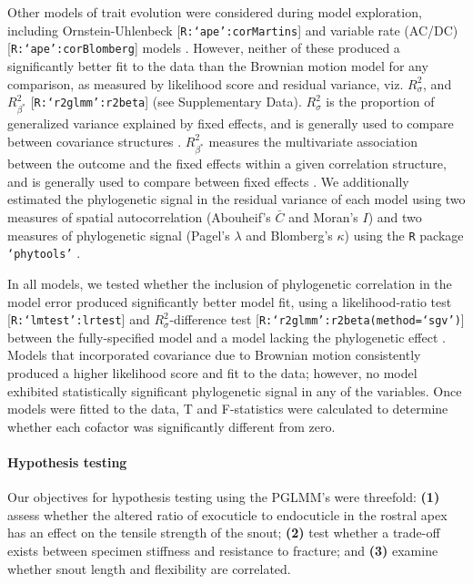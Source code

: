 \documentclass[twocolumn, linenumbers, superscriptaddress, nofootinbib]{revtex4-1}
\begin{document}
				Other models of trait evolution were considered during model exploration, including Ornstein-Uhlenbeck [\texttt{R:`ape':corMartins}] and variable rate (AC/DC) [\texttt{R:`ape':corBlomberg}] models \cite{Munkemuller2012, Ape}.
				However, neither of these produced a significantly better fit to the data than the Brownian motion model for any comparison, as measured by likelihood score and residual variance, viz. $R^2_{\sigma}$, and $R^2_{\beta^*}$ [\texttt{R:`r2glmm':r2beta}] (see Supplementary Data).
				$R^{2}_{\sigma}$ is the proportion of generalized variance explained by fixed effects, and is generally used to compare between covariance structures \cite{Nakagawa2013, Jaeger2016, R2glmm}.
				$R^2_{\beta^*}$ measures the multivariate association between the outcome and the fixed effects within a given correlation structure, and is generally used to compare between fixed effects  \cite{Nakagawa2013, Jaeger2016, R2glmm}.
				We additionally estimated the phylogenetic signal in the residual variance of each model using two measures of spatial autocorrelation (Abouheif's $\bar{C}$ and Moran's $I$) and two measures of phylogenetic signal (Pagel's $\lambda$ and Blomberg's $\kappa$) using the \texttt{R} package \texttt{`phytools'} \cite{Munkemuller2012, Phytools}.
				
				In all models, we tested whether the inclusion of phylogenetic correlation in the model error produced significantly better model fit, using a likelihood-ratio test [\texttt{R:`lmtest':lrtest}] and $R^{2}_{\sigma}$-difference test [\texttt{R:`r2glmm':r2beta(method=`sgv')}] between the fully-specified model and a model lacking the phylogenetic effect \cite{Lmtest, R2glmm}.
				Models that incorporated covariance due to Brownian motion consistently produced a higher likelihood score and fit to the data; however, no model exhibited statistically significant phylogenetic signal in any of the variables.
				Once models were fitted to the data, T and F-statistics were calculated to determine whether each cofactor was significantly different from zero.
				
			\paragraph*{Hypothesis testing}
				Our objectives for hypothesis testing using the PGLMM's were threefold: \textbf{(1)} assess whether the altered ratio of exocuticle to endocuticle in the rostral apex has an effect on the tensile strength of the snout; \textbf{(2)} test whether a trade-off exists between specimen stiffness and resistance to fracture; and \textbf{(3)} examine whether snout length and flexibility are correlated.
				
\end{document}

